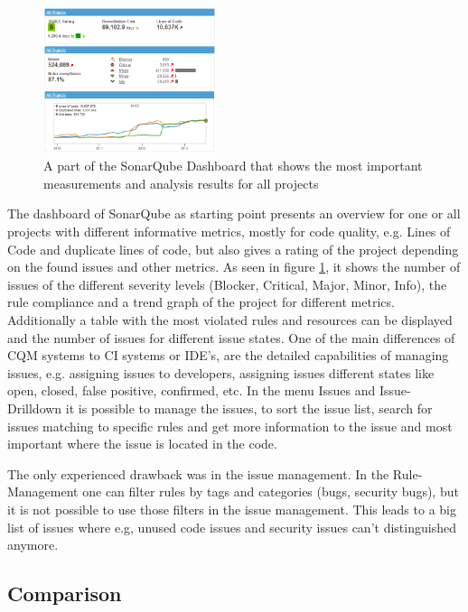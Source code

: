 \documentclass[conference]{IEEEtran}
\begin{document}
\begin{figure}[t]
	\centering
	\includegraphics[width=0.45\textwidth]{img/Sonarqube.png}
	\caption{A part of the SonarQube Dashboard that shows the most important measurements and analysis results for all projects}
	\label{fig:sonarqube-dashboard}
\end{figure}


The dashboard of SonarQube as starting point presents an overview for one or all projects with different informative metrics, mostly for code quality, e.g. Lines of Code and duplicate lines of code, but also gives a rating of the project depending on the found issues and other metrics.
As seen in figure \ref{fig:sonarqube-dashboard}, it shows the number of issues of the different severity levels (Blocker, Critical, Major, Minor, Info), the rule compliance and a trend graph of the project for different metrics.
Additionally a table with the most violated rules and resources can be displayed and the number of issues for different issue states.
One of the main differences of CQM systems to CI systems or IDE's, are the detailed capabilities of managing issues, e.g. assigning issues to developers, assigning issues different states like open, closed, false positive, confirmed, etc. 
In the menu Issues and Issue-Drilldown it is possible to manage the issues, to sort the issue list, search for issues matching to specific rules and get more information to the issue and most important where the issue is located in the code.


The only experienced drawback was in the issue management.
In the Rule-Management one can filter rules by tags and categories (bugs, security bugs), but it is not possible to use those filters in the issue management. 
This leads to a big list of issues where e.g, unused code issues and security issues can't distinguished anymore.



\subsection{Comparison}
\label{subsec:comparation}
\end{document}
